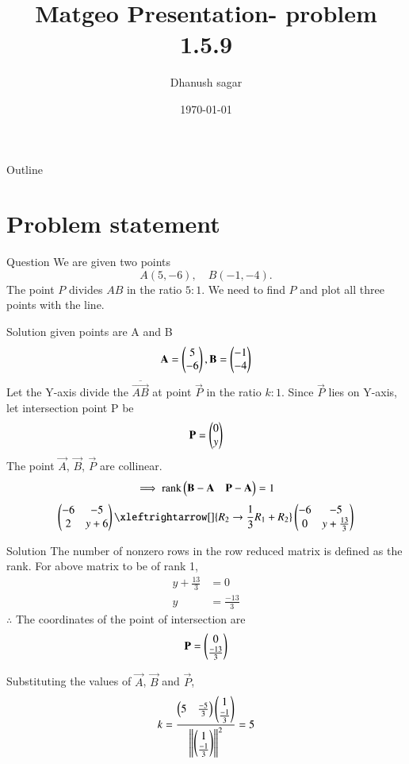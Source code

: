 \documentclass{beamer}
\title{Matgeo Presentation- problem 1.5.9}
\author{Dhanush sagar}
\institute{IIT Hyderabad}
\date{\today}
\begin{document}
\begin{frame}
  \titlepage
\end{frame}

\begin{frame}{Outline}
  \tableofcontents
\end{frame}

\section{Problem statement}
\begin{frame}{Question}
We are given two points 
\[ A(5,-6), \quad B(-1,-4). \]
The point $P$ divides $AB$ in the ratio $5:1$. We need to find $P$ and plot all three points with the line.
\end{frame}


\begin{frame}{Solution}
given points are A and B
\begin{align*} \mathbf{A} = \begin{pmatrix}5 \\ -6\end{pmatrix}, \mathbf{B} = \begin{pmatrix}-1 \\ -4\end{pmatrix} \end{align*}
Let the Y-axis divide the \(\overline{\vec{AB}}\) at point $\vec{P}$ in the ratio $k:1$.
Since $\vec{P}$ lies on Y-axis, let intersection point P be
\begin{align*}
\mathbf{P} = \begin{pmatrix}0 \\ y\end{pmatrix}
\end{align*}
The point $\vec{A}$, $\vec{B}$, $\vec{P}$ are collinear.
\begin{align}
\implies \text{rank}\begin{pmatrix}\mathbf{B}-\mathbf{A} & \mathbf{P}-\mathbf{A}\end{pmatrix} = 1
\end{align}
\begin{align}
\myvec{-6 & -5 \\ 2 & y+6} \xleftrightarrow[]{R_2 \rightarrow {\frac{1}{3}R_1 + R_2}}\myvec{-6 & -5 \\ 0 & y+\frac{13}{3}}  
\end{align}

\end{frame}


\begin{frame}{Solution}
The number of nonzero rows in the row reduced matrix is defined as the rank. For above matrix to be of rank 1,
\begin{align}
y+\frac{13}{3} &= 0 \\
y &= \frac{-13}{3}
\end{align}
$\therefore$ The coordinates of the point of intersection are 
\begin{align*}
\mathbf{P} = \begin{pmatrix}0 \\ \frac{-13}{3}\end{pmatrix}
\end{align*}

Substituting the values of $\vec{A}$, $\vec{B}$ and $\vec{P}$,
\begin{align}
k=\frac{\begin{pmatrix}5 & \frac{-5}{3}\end{pmatrix}\begin{pmatrix}1 \\ \frac{-1}{3}\end{pmatrix}}{\left\lVert\begin{pmatrix}1 \\ \frac{-1}{3}\end{pmatrix}\right\rVert^2}=5
\end{align}
\end{frame}
\end{document}
